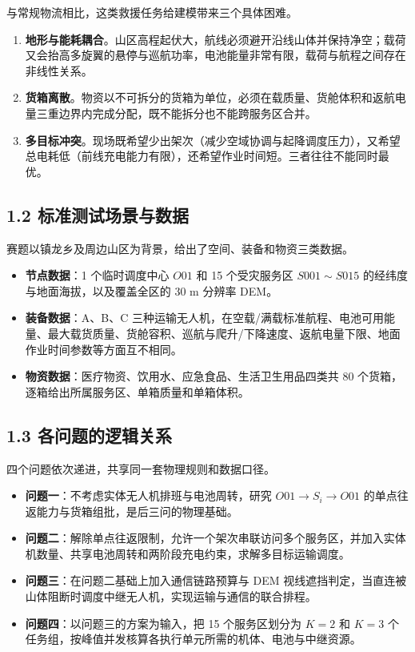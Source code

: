 \documentclass[withoutpreface,bwprint]{format}
\begin{document}
与常规物流相比，这类救援任务给建模带来三个具体困难。

\begin{enumerate}[leftmargin=*]
    \item \textbf{地形与能耗耦合}。山区高程起伏大，航线必须避开沿线山体并保持净空；载荷又会抬高多旋翼的悬停与巡航功率，电池能量非常有限，载荷与航程之间存在非线性关系。
    \item \textbf{货箱离散}。物资以不可拆分的货箱为单位，必须在载质量、货舱体积和返航电量三重边界内完成分配，既不能拆分也不能跨服务区合并。
    \item \textbf{多目标冲突}。现场既希望少出架次（减少空域协调与起降调度压力），又希望总电耗低（前线充电能力有限），还希望作业时间短。三者往往不能同时最优。
\end{enumerate}

\subsection{1.2 标准测试场景与数据}
赛题以镇龙乡及周边山区为背景，给出了空间、装备和物资三类数据。

\begin{itemize}[leftmargin=*]
    \item \textbf{节点数据}：1 个临时调度中心 $O01$ 和 15 个受灾服务区 $S001\sim S015$ 的经纬度与地面海拔，以及覆盖全区的 30 m 分辨率 DEM。
    \item \textbf{装备数据}：A、B、C 三种运输无人机，在空载/满载标准航程、电池可用能量、最大载货质量、货舱容积、巡航与爬升/下降速度、返航电量下限、地面作业时间参数等方面互不相同。
    \item \textbf{物资数据}：医疗物资、饮用水、应急食品、生活卫生用品四类共 80 个货箱，逐箱给出所属服务区、单箱质量和单箱体积。
\end{itemize}

\subsection{1.3 各问题的逻辑关系}
四个问题依次递进，共享同一套物理规则和数据口径。

\begin{itemize}[leftmargin=*]
    \item \textbf{问题一}：不考虑实体无人机排班与电池周转，研究 $O01 \to S_i \to O01$ 的单点往返能力与货箱组批，是后三问的物理基础。
    \item \textbf{问题二}：解除单点往返限制，允许一个架次串联访问多个服务区，并加入实体机数量、共享电池周转和两阶段充电约束，求解多目标运输调度。
    \item \textbf{问题三}：在问题二基础上加入通信链路预算与 DEM 视线遮挡判定，当直连被山体阻断时调度中继无人机，实现运输与通信的联合排程。
    \item \textbf{问题四}：以问题三的方案为输入，把 15 个服务区划分为 $K=2$ 和 $K=3$ 个任务组，按峰值并发核算各执行单元所需的机体、电池与中继资源。
\end{itemize}
\end{document}
